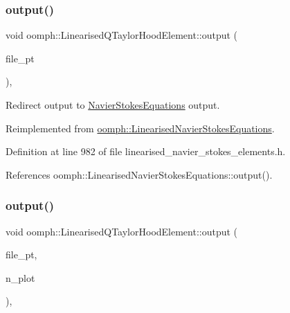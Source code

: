 \subsubsection{\texorpdfstring{output()}{output()}\hspace{0.1cm}{\footnotesize\ttfamily [3/4]}}
{\footnotesize\ttfamily void oomph\+::\+Linearised\+Q\+Taylor\+Hood\+Element\+::output (\begin{DoxyParamCaption}\item[{F\+I\+LE $\ast$}]{file\+\_\+pt }\end{DoxyParamCaption})\hspace{0.3cm}{\ttfamily [inline]}, {\ttfamily [virtual]}}



Redirect output to \hyperlink{classoomph_1_1NavierStokesEquations}{Navier\+Stokes\+Equations} output. 



Reimplemented from \hyperlink{classoomph_1_1LinearisedNavierStokesEquations_a2e1eef71bdd6a06e2b7e8b8488e39437}{oomph\+::\+Linearised\+Navier\+Stokes\+Equations}.



Definition at line 982 of file linearised\+\_\+navier\+\_\+stokes\+\_\+elements.\+h.



References oomph\+::\+Linearised\+Navier\+Stokes\+Equations\+::output().

\mbox{\label{classoomph_1_1LinearisedQTaylorHoodElement_a2725e5c308afb58f54dfb16aef114a31}} 
\subsubsection{\texorpdfstring{output()}{output()}\hspace{0.1cm}{\footnotesize\ttfamily [4/4]}}
{\footnotesize\ttfamily void oomph\+::\+Linearised\+Q\+Taylor\+Hood\+Element\+::output (\begin{DoxyParamCaption}\item[{F\+I\+LE $\ast$}]{file\+\_\+pt,  }\item[{const unsigned \&}]{n\+\_\+plot }\end{DoxyParamCaption})\hspace{0.3cm}{\ttfamily [inline]}, {\ttfamily [virtual]}}



